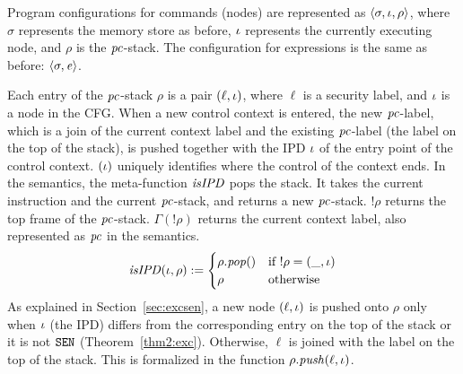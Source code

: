 Program configurations for commands (nodes) are
represented as $\langle \sigma, \iota, \rho \rangle$, where
$\sigma$ represents the memory store as before, $\iota$ represents the
currently executing node, 
and $\rho$ is the $\mathit{pc}$-stack. The configuration for expressions is
the same as before: $\langle \sigma, \mathit{e} \rangle$. 


Each entry of the $\mathit{pc}$-stack $\rho$ is a pair $(\ell, \iota)$,
where $\ell$ is a security label, and $\iota$ is a node in the
CFG. When a new control context is entered, the new $\mathit{pc}$-label, which
is a join of the current context label and the existing $\mathit{pc}$-label
(the label on the top of the stack), is pushed together with the IPD
$\iota$ of the entry point of the control  context. $(\iota)$ uniquely
identifies where the control of the context ends. In the semantics,
the meta-function $\mathit{isIPD}$ pops the stack. It takes the current 
instruction and the current $\mathit{pc}$-stack, and returns a new
$\mathit{pc}$-stack. $!\rho$ returns the top frame of the
$\mathit{pc}$-stack. $\Gamma(!\rho)$ returns the current context 
label, also represented as $\mathit{pc}$ in the semantics.
\begin{equation*}
 \mathit{isIPD}(\iota, \rho) := 
 \begin{cases}
   \rho.\mathit{pop()} & \mbox{if}~ !\rho = (\_, \iota)
\\ \rho & \mbox{otherwise}
 \end{cases}
\end{equation*} 
As explained in Section~\ref{sec:excsen}, a new node $(\ell,
\iota)$ is pushed onto $\rho$ only when $\iota$ (the IPD)
differs from the corresponding entry on the top of the stack or it is
not $\texttt{SEN}$ (Theorem~\ref{thm2:exc}). Otherwise, $\ell$ is joined 
with the label on the top of the stack. This is formalized in the
function $\rho.\mathit{push}(\ell, \iota)$. 

